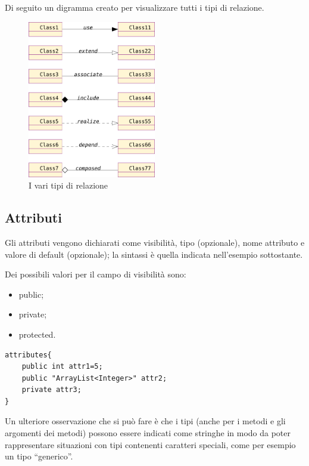 Di seguito un digramma creato per visualizzare tutti i tipi di relazione.

\begin{figure}[htp]
\begin{center}
  \includegraphics[width=0.5\textwidth]{img/relation_arrow}
  \caption[labelInTOC]{I vari tipi di relazione}
\end{center}
\end{figure}


\subsection{Attributi}

Gli attributi vengono dichiarati come visibilità, tipo (opzionale), nome
attributo e valore di default (opzionale); la sintassi è
quella indicata nell'esempio sottostante.

Dei possibili valori per il campo di visibilità sono:
\begin{itemize}
  \item public;
  \item private;
  \item protected.
\end{itemize}


\begin{lstlisting}[caption={Dichiarazione di attributi}, style={model}]
attributes{
	public int attr1=5;
	public "ArrayList<Integer>" attr2;
	private attr3;
}
\end{lstlisting}

Un ulteriore osservazione che si può fare è che i tipi (anche per i metodi e gli 
argomenti dei metodi) possono essere indicati come stringhe in modo da poter 
rappresentare situazioni con tipi contenenti caratteri speciali, come per esempio
un tipo ``generico''.

